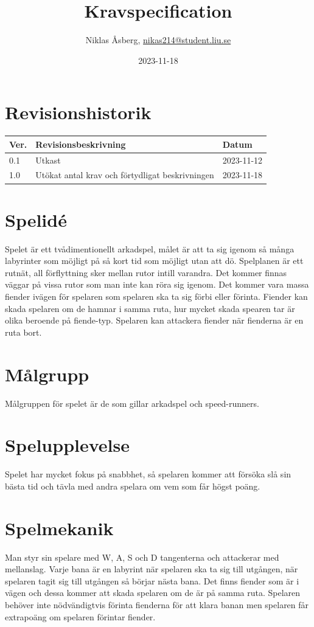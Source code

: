 \documentclass{TDP005mall}
\author{Niklas Åsberg, \url{nikas214@student.liu.se}}
\title{Kravspecification}
\date{2023-11-18}
\begin{document}
\projectpage
\section{Revisionshistorik}
\begin{table}[!h]
\begin{tabularx}{\linewidth}{|l|X|l|}
\hline
Ver. & Revisionsbeskrivning & Datum \\\hline
0.1 & Utkast & 2023-11-12 \\\hline
1.0 & Utökat antal krav och förtydligat beskrivningen & 2023-11-18 \\\hline
\end{tabularx}
\end{table}

\tableofcontents
\newpage

\section{Spelidé}
Spelet är ett tvådimentionellt arkadspel, målet är att ta sig igenom så många labyrinter som möjligt på så kort tid som möjligt utan att dö.
Spelplanen är ett rutnät, all förflyttning sker mellan rutor intill varandra. Det kommer finnas väggar på vissa rutor som man inte kan röra sig igenom.
Det kommer vara massa fiender ivägen för spelaren som spelaren ska ta sig förbi eller förinta. 
Fiender kan skada spelaren om de hamnar i samma ruta, hur mycket skada spearen tar är olika beroende på fiende-typ.
Spelaren kan attackera fiender när fienderna är en ruta bort.

\section{Målgrupp}
Målgruppen för spelet är de som gillar arkadspel och speed-runners.

\section{Spelupplevelse}
Spelet har mycket fokus på snabbhet, så spelaren kommer att försöka slå sin bästa tid och tävla med andra spelara om vem som får högst poäng.

\section{Spelmekanik}
Man styr sin spelare med W, A, S och D tangenterna och attackerar med mellanslag. Varje bana är en labyrint när spelaren ska ta sig till utgången, när spelaren tagit sig till utgången så börjar nästa bana.
Det finns fiender som är i vägen och dessa kommer att skada spelaren om de är på samma ruta.
Spelaren behöver inte nödvändigtvis förinta fienderna för att klara banan men spelaren får extrapoäng om spelaren förintar fiender.
\end{document}
